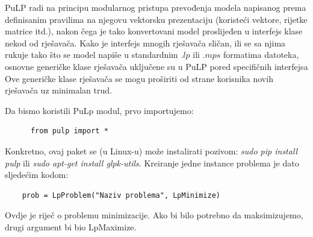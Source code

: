 \documentclass[a4paper, utf8, 11pt, colorlinks]{book}
\begin{document}
 PuLP radi na principu modularnog pristupa prevođenja modela napisanog prema definisanim pravilima na njegovu vektorsku prezentaciju (koristeći vektore, rijetke matrice itd.), nakon čega je tako konvertovani model proslijeđen u interfejs klase nekod od rješavača. Kako je interfejs mnogih rješavača sličan, ili se sa njima rukuje tako što se model napiše u standardnim .$lp$ ili .$mps$  formatima  datoteka, osnovne generičke klase rješavača uključene su u PuLP  pored specifičnih interfejsa %
 Ove generičke klase rješavača se mogu proširiti od strane korisnika novih rješavača uz minimalan trud.   
 
 Da bismo koristili PuLp modul, prvo importujemo:
 \begin{verbatim}
 	  from pulp import *
 \end{verbatim}
 Konkretno, ovaj paket se (u Linux-u) može instalirati pozivom: \emph{sudo pip install pulp} ili \emph{sudo apt-get install glpk-utils}. 
 Kreiranje jedne instance problema je dato sljedećim kodom:
 \begin{verbatim}
 	prob = LpProblem("Naziv problema", LpMinimize)
 \end{verbatim}
Ovdje je   riječ o problemu minimizacije. Ako bi bilo potrebno da maksimizujemo, drugi argument bi bio 
LpMaximize. 
\end{document}
